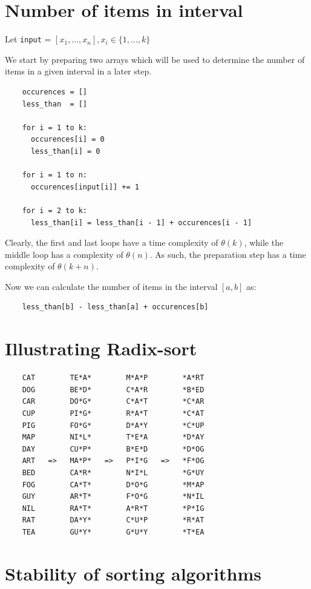 \documentclass[a4paper]{scrartcl}
\begin{document}
\section{Number of items in interval}

Let \texttt{input} = $[x_1, ..., x_n], x_i \in \{1, ..., k\}$

We start by preparing two arrays which will be used to determine the number of
items in a given interval in a later step.

\begin{verbatim}
	occurences = []
	less_than  = []

	for i = 1 to k:
	  occurences[i] = 0
	  less_than[i] = 0

	for i = 1 to n:
	  occurences[input[i]] += 1

	for i = 2 to k:
	  less_than[i] = less_than[i - 1] + occurences[i - 1]
\end{verbatim}

Clearly, the first and last loops have a time complexity of $\theta(k)$, while
the middle loop has a complexity of $\theta(n)$. As such, the preparation step
has a time complexity of $\theta(k + n)$.

Now we can calculate the number of items in the interval $[a, b]$ as:
\begin{verbatim}
	less_than[b] - less_than[a] + occurences[b]
\end{verbatim}

\section{Illustrating Radix-sort}

\begin{verbatim}
    CAT        TE*A*        M*A*P        *A*RT
    DOG        BE*D*        C*A*R        *B*ED
    CAR        DO*G*        C*A*T        *C*AR
    CUP        PI*G*        R*A*T        *C*AT
    PIG        FO*G*        D*A*Y        *C*UP
    MAP        NI*L*        T*E*A        *D*AY
    DAY        CU*P*        B*E*D        *D*OG
    ART   =>   MA*P*   =>   P*I*G   =>   *F*OG
    BED        CA*R*        N*I*L        *G*UY
    FOG        CA*T*        D*O*G        *M*AP
    GUY        AR*T*        F*O*G        *N*IL
    NIL        RA*T*        A*R*T        *P*IG
    RAT        DA*Y*        C*U*P        *R*AT
    TEA        GU*Y*        G*U*Y        *T*EA
\end{verbatim}

\section{Stability of sorting algorithms}
\end{document}
